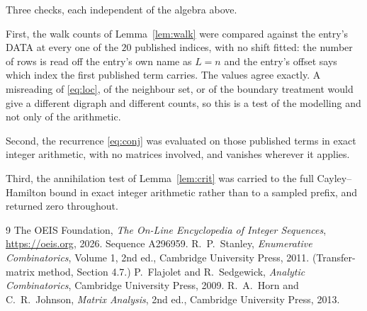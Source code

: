 \documentclass[11pt,a4paper]{article}
\theoremstyle{plain}
\theoremstyle{definition}
\begin{document}
Three checks, each independent of the algebra above.

First, the walk counts of Lemma~\ref{lem:walk} were compared against the entry's DATA at
every one of the $20$ published indices, with no shift fitted: the number of rows is
read off the entry's own name as $L=n$ and the entry's offset says which index the first
published term carries. The values agree exactly. A misreading of \eqref{eq:loc}, of the
neighbour set, or of the boundary treatment would give a different digraph and different
counts, so this is a test of the modelling and not only of the arithmetic.

Second, the recurrence \eqref{eq:conj} was evaluated on those published terms in exact
integer arithmetic, with no matrices involved, and vanishes wherever it applies.

Third, the annihilation test of Lemma~\ref{lem:crit} was carried to the full
Cayley--Hamilton bound in exact integer arithmetic rather than to a sampled prefix, and
returned zero throughout.

\begin{thebibliography}{9}
 The OEIS Foundation, \emph{The On-Line Encyclopedia of Integer
Sequences}, \url{https://oeis.org}, 2026. Sequence A296959.
 R.~P.~Stanley, \emph{Enumerative Combinatorics}, Volume 1, 2nd ed.,
Cambridge University Press, 2011. (Transfer-matrix method, Section 4.7.)
 P.~Flajolet and R.~Sedgewick, \emph{Analytic Combinatorics}, Cambridge
University Press, 2009.
 R.~A.~Horn and C.~R.~Johnson, \emph{Matrix Analysis}, 2nd ed., Cambridge
University Press, 2013.
\end{thebibliography}
\end{document}
